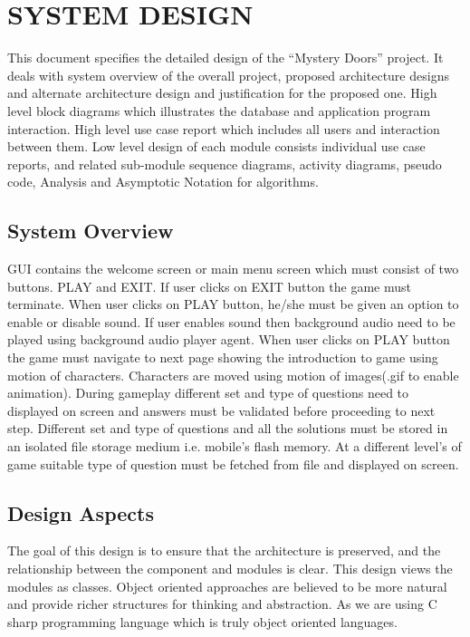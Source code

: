 \chapter{SYSTEM DESIGN}

This document specifies the detailed design of the “Mystery Doors” project.  It deals  with  system  overview  of  the  overall  project,  proposed  architecture  designs  and alternate  architecture  design  and  justification  for  the  proposed  one.  High  level  block diagrams which  illustrates  the  database  and  application  program  interaction. High level use case report which includes all users and interaction between them. Low level design of each module consists individual use case reports, and related sub-module sequence diagrams, activity diagrams, pseudo code, Analysis and Asymptotic Notation for algorithms.

\section{System Overview}
\hspace{1cm}GUI contains the welcome screen or main menu screen which must consist of two buttons. PLAY and EXIT. If user clicks on EXIT button the game must terminate. When user clicks on PLAY button, he/she must be given an option to enable or disable sound. If user enables sound then background audio need to be played using background audio player agent. 
When user clicks on PLAY button the game must navigate to next page showing the introduction to game using motion of characters. Characters are moved using motion of images(.gif to enable animation). During gameplay different set and type of questions need to displayed on screen and answers must be validated before proceeding to next step. Different set and type of questions and all the solutions must be stored in an isolated file storage medium i.e. mobile’s flash memory. At a different level’s of game suitable type of question must be fetched from file and displayed on screen.


\section{Design Aspects}
\hspace{1cm}
                            The goal of this design is to ensure that the architecture is preserved, and the relationship between the component and modules is clear.  This design views the modules as classes. Object oriented approaches are believed to be more natural and provide richer structures for thinking and abstraction. As we are using C sharp  programming language which is truly object oriented languages.

